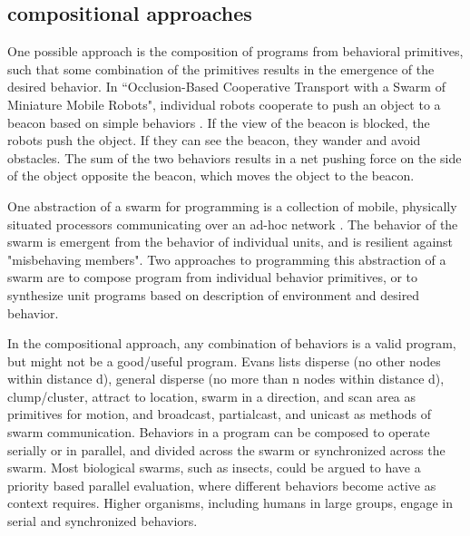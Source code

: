 \documentclass[]{article}
\begin{document}
\subsection{compositional approaches}

One possible approach is the composition of programs from behavioral primitives, such that some combination of the primitives results in the emergence of the desired behavior. 
In ``Occlusion-Based Cooperative Transport with a Swarm of Miniature Mobile Robots", individual robots cooperate to push an object to a beacon based on simple behaviors \cite{chen2015occlusion}. 
If the view of the beacon is blocked, the robots push the object. 
If they can see the beacon, they wander and avoid obstacles. 
The sum of the two behaviors results in a net pushing force on the side of the object opposite the beacon, which moves the object to the beacon. 

One abstraction of a swarm for programming is a collection of mobile, physically situated processors communicating over an ad-hoc network \cite{evans2000programming}. The behavior of the swarm is emergent from the behavior of individual units, and is  resilient against "misbehaving members".
Two approaches to programming this abstraction of a swarm are to compose program from individual behavior primitives, or to synthesize unit programs based on description of environment and desired behavior. 

In the compositional approach, any combination of behaviors is a valid program, but might not be a good/useful program. 
Evans lists disperse (no other nodes within distance d), general disperse (no more than n nodes within distance d), clump/cluster, attract to location, swarm in a direction, and scan area as primitives for motion, and broadcast, partialcast, and unicast as methods of swarm communication.
Behaviors in a program can be composed to operate serially or in parallel, and divided across the swarm or synchronized across the swarm. 
Most biological swarms, such as insects, could be argued to have a priority based parallel evaluation, where different behaviors become active as context requires.
Higher organisms, including humans in large groups, engage in serial and synchronized behaviors. %
\end{document}
